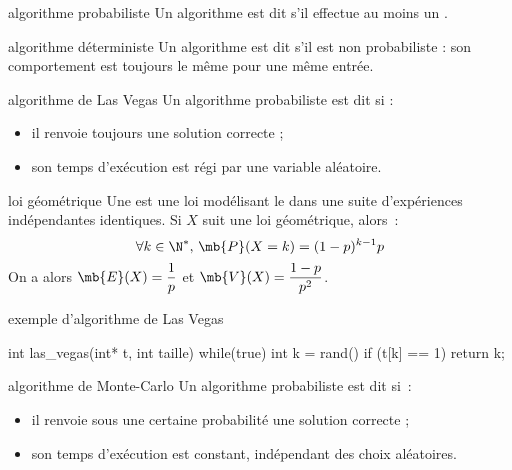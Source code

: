 

\begin{adjustwidth}{-3cm}{-3cm}


\begin{definition}{6.1}{algorithme probabiliste}
    Un algorithme est dit  s'il effectue au moins un .
\end{definition}

\begin{definition}{6.2}{algorithme déterministe}
    Un algorithme est dit  s'il est non probabiliste : son comportement est toujours le même pour une même entrée.
\end{definition}

\begin{definition}{6.3}{algorithme de Las Vegas}
    Un algorithme probabiliste est dit  si : 
    \begin{itemize}
        \item il renvoie toujours une solution correcte ;
        \item son temps d'exécution est régi par une variable aléatoire.
    \end{itemize}
\end{definition}

\begin{definition}{6.4}{loi géométrique}
    Une  est une loi modélisant le  dans une suite d'expériences indépendantes identiques. Si $X$ suit une loi géométrique, alors~:
    $$\forall k \in \N^*,\, \mb{P}(X = k) = (1-p)^{k-1} p$$
    On a alors $\displaystyle \mb{E}(X) = \frac{1}{p}$ et $\displaystyle \mb{V}(X) = \frac{1-p}{p^2}$.
\end{definition}

\begin{implementation}{exemple d'algorithme de Las Vegas}
    \begin{lstC}
    int las_vegas(int* t, int taille){
        while(true) {
            int k = rand() %
            if (t[k] == 1){
                return k;
            }
        }
    }
    \end{lstC}
\end{implementation}

\begin{definition}{6.5}{algorithme de Monte-Carlo}
    Un algorithme probabiliste est dit  si~: 
    \begin{itemize}
        \item il renvoie sous une certaine probabilité une solution correcte ;
        \item son temps d'exécution est constant, indépendant des choix aléatoires. 
    \end{itemize}
\end{definition}


\end{adjustwidth}
